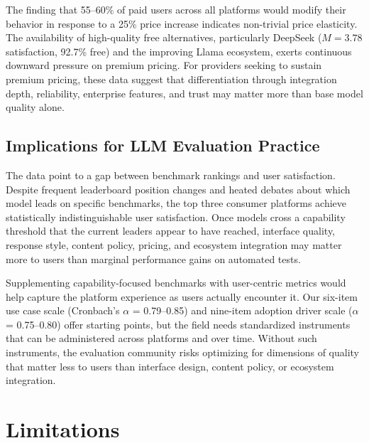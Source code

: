 \documentclass[10pt,twocolumn]{article}
\begin{document}
The finding that 55--60\% of paid users across all platforms would modify their behavior in response to a 25\% price increase indicates non-trivial price elasticity. The availability of high-quality free alternatives, particularly DeepSeek ($M=3.78$ satisfaction, 92.7\% free) and the improving Llama ecosystem, exerts continuous downward pressure on premium pricing. For providers seeking to sustain premium pricing, these data suggest that differentiation through integration depth, reliability, enterprise features, and trust may matter more than base model quality alone.


\subsection{Implications for LLM Evaluation Practice}

The data point to a gap between benchmark rankings and user satisfaction. Despite frequent leaderboard position changes and heated debates about which model leads on specific benchmarks, the top three consumer platforms achieve statistically indistinguishable user satisfaction. Once models cross a capability threshold that the current leaders appear to have reached, interface quality, response style, content policy, pricing, and ecosystem integration may matter more to users than marginal performance gains on automated tests.

Supplementing capability-focused benchmarks with user-centric metrics would help capture the platform experience as users actually encounter it. Our six-item use case scale (Cronbach's $\alpha$ = 0.79--0.85) and nine-item adoption driver scale ($\alpha$ = 0.75--0.80) offer starting points, but the field needs standardized instruments that can be administered across platforms and over time. Without such instruments, the evaluation community risks optimizing for dimensions of quality that matter less to users than interface design, content policy, or ecosystem integration.


\section{Limitations}
\label{sec:limitations}
\end{document}
